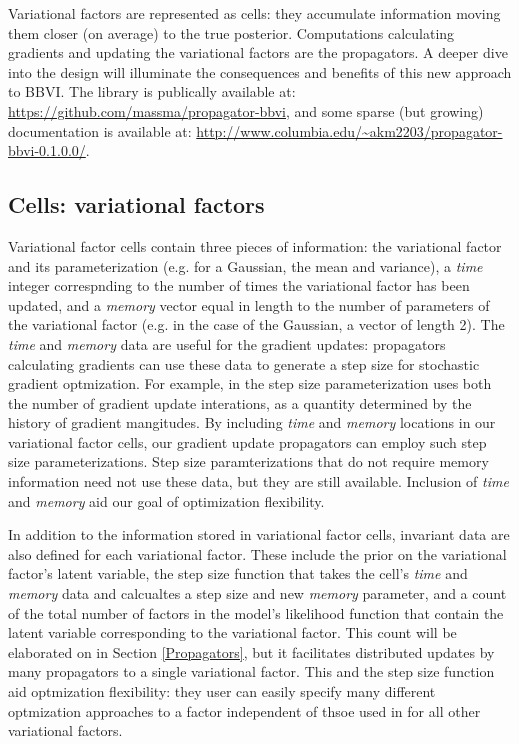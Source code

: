 \documentclass[12pt]{article}
\begin{document}
Variational factors are represented as cells: they accumulate
information moving them closer (on average) to the true
posterior. Computations calculating gradients and updating the
variational factors are the propagators. A deeper dive into the design
will illuminate the consequences and benefits of this new approach to
BBVI. The library is publically available at:
\url{https://github.com/massma/propagator-bbvi}, and some sparse (but
growing) documentation is available at:
\url{http://www.columbia.edu/~akm2203/propagator-bbvi-0.1.0.0/}.

\subsection{Cells: variational factors}

Variational factor cells contain three pieces of information: the
variational factor and its parameterization (e.g. for a Gaussian, the
mean and variance), a \textit{time} integer correspnding to the number
of times the variational factor has been updated, and a
\textit{memory} vector equal in length to the number of parameters of
the variational factor (e.g. in the case of the Gaussian, a vector of
length 2). The \textit{time} and \textit{memory} data are useful for
the gradient updates: propagators calculating gradients can use these
data to generate a step size for stochastic gradient optmization. For
example, in \citet{kuc-2017} the step size parameterization uses both
the number of gradient update interations, as a quantity determined by
the history of gradient mangitudes. By including \textit{time} and
\textit{memory} locations in our variational factor cells, our
gradient update propagators can employ such step size
parameterizations. Step size paramterizations that do not require
memory information need not use these data, but they are still
available. Inclusion of \textit{time} and \textit{memory} aid our goal
of optimization flexibility.

In addition to the information stored in variational factor cells,
invariant data are also defined for each variational factor. These
include the prior on the variational factor's latent variable, the
step size function that takes the cell's \textit{time} and
\textit{memory} data and calcualtes a step size and new
\textit{memory} parameter, and a count of the total number of factors
in the model's likelihood function that contain the latent variable
corresponding to the variational factor. This count will be elaborated
on in Section \ref{Propagators}, but it facilitates distributed
updates by many propagators to a single variational factor. This and
the step size function aid optmization flexibility: they user can
easily specify many different optmization approaches to a factor
independent of thsoe used in for all other variational factors.
\end{document}
